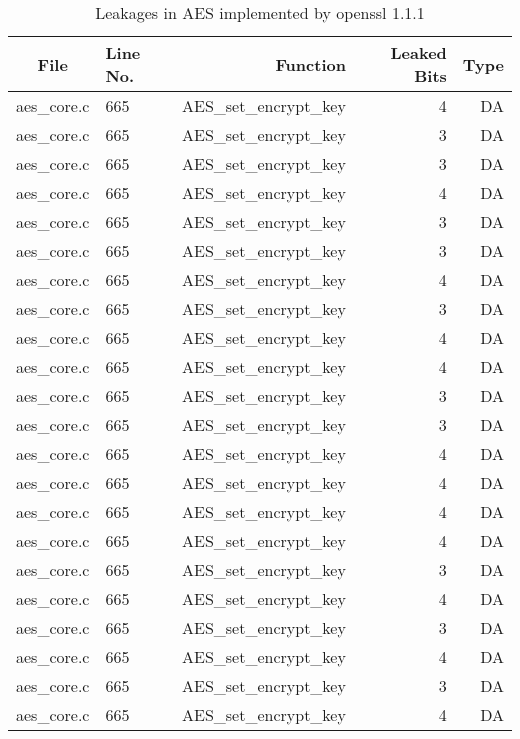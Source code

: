 \begin{table}%
\centering\tiny\scriptsize
\renewcommand{\baselinestretch}{0.96}\selectfont
\caption{Leakages in AES implemented by openssl 1.1.1}\label{tab:AESopenssl}
\begin{tabular}{clrrr}
\hline
\textbf{File} & \textbf{Line No.} & \textbf{Function} & \textbf{Leaked Bits} & \textbf{Type} \\\hline
aes\_core.c& 665&AES\_set\_encrypt\_key&4 &DA\\
aes\_core.c& 665&AES\_set\_encrypt\_key&3 &DA\\
aes\_core.c& 665&AES\_set\_encrypt\_key&3 &DA\\
aes\_core.c& 665&AES\_set\_encrypt\_key&4 &DA\\
aes\_core.c& 665&AES\_set\_encrypt\_key&3 &DA\\
aes\_core.c& 665&AES\_set\_encrypt\_key&3 &DA\\
aes\_core.c& 665&AES\_set\_encrypt\_key&4 &DA\\
aes\_core.c& 665&AES\_set\_encrypt\_key&3 &DA\\
aes\_core.c& 665&AES\_set\_encrypt\_key&4 &DA\\
aes\_core.c& 665&AES\_set\_encrypt\_key&4 &DA\\
aes\_core.c& 665&AES\_set\_encrypt\_key&3 &DA\\
aes\_core.c& 665&AES\_set\_encrypt\_key&3 &DA\\
aes\_core.c& 665&AES\_set\_encrypt\_key&4 &DA\\
aes\_core.c& 665&AES\_set\_encrypt\_key&4 &DA\\
aes\_core.c& 665&AES\_set\_encrypt\_key&4 &DA\\
aes\_core.c& 665&AES\_set\_encrypt\_key&4 &DA\\
aes\_core.c& 665&AES\_set\_encrypt\_key&3 &DA\\
aes\_core.c& 665&AES\_set\_encrypt\_key&4 &DA\\
aes\_core.c& 665&AES\_set\_encrypt\_key&3 &DA\\
aes\_core.c& 665&AES\_set\_encrypt\_key&4 &DA\\
aes\_core.c& 665&AES\_set\_encrypt\_key&3 &DA\\
aes\_core.c& 665&AES\_set\_encrypt\_key&4 &DA\\

\end{tabular}
\end{table}
